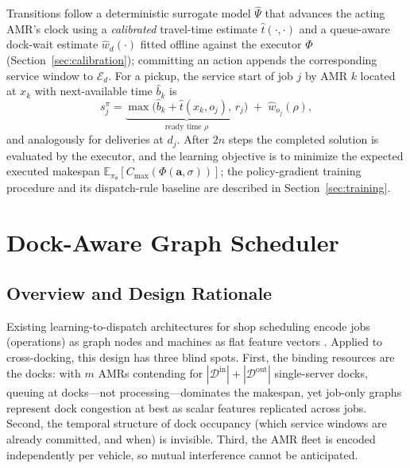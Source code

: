 Transitions follow a deterministic surrogate model $\hat{\Psi}$ that
advances the acting AMR's clock using a \emph{calibrated} travel-time
estimate $\hat{t}(\cdot,\cdot)$ and a queue-aware dock-wait estimate
$\hat{w}_d(\cdot)$ fitted offline against the executor $\Phi$
(Section~\ref{sec:calibration}); committing an action appends the
corresponding service window to $\mathcal{E}_d$. For a pickup, the
service start of job $j$ by AMR $k$ located at $x_k$ with next-available
time $\hat{b}_k$ is
\begin{equation}
s^{\pi}_j=\underbrace{\max\!\big(\hat{b}_k+\hat{t}(x_k,o_j),\, r_j\big)}_{\text{ready time }\rho}
\;+\;\hat{w}_{o_j}(\rho),
\label{eq:surrogate}
\end{equation}
and analogously for deliveries at $d_j$. After $2n$ steps the completed
solution is evaluated by the executor, and the learning objective is to
minimize the expected executed makespan
$\mathbb{E}_{\pi_\theta}\!\left[C_{\max}(\Phi(\bm{a},\sigma))\right]$;
the policy-gradient training procedure and its dispatch-rule baseline
are described in Section~\ref{sec:training}.


\section{Dock-Aware Graph Scheduler}
\label{sec:architecture}

\subsection{Overview and Design Rationale}

Existing learning-to-dispatch architectures for shop scheduling encode
jobs (operations) as graph nodes and machines as flat feature vectors
\cite{zhang2020l2d,song2023fjsp}. Applied to cross-docking, this design
has three blind spots. First, the binding resources are the docks: with
$m$ AMRs contending for $|\mathcal{D}^{\mathrm{in}}|+|\mathcal{D}^{\mathrm{out}}|$
single-server docks, queuing at docks---not processing---dominates the
makespan, yet job-only graphs represent dock congestion at best as
scalar features replicated across jobs. Second, the temporal structure
of dock occupancy (which service windows are already committed, and
when) is invisible. Third, the AMR fleet is encoded independently
per vehicle, so mutual interference cannot be anticipated.

